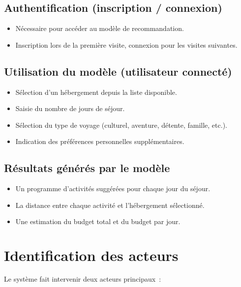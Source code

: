 \documentclass[12pt,a4paper]{report}
\begin{document}
\section{Authentification (inscription / connexion)}

\begin{itemize}
  \item Nécessaire pour accéder au modèle de recommandation.
  \item Inscription lors de la première visite, connexion pour les visites
        suivantes.
\end{itemize}

\section{Utilisation du modèle (utilisateur connecté)}

\begin{itemize}
  \item Sélection d'un hébergement depuis la liste disponible.
  \item Saisie du nombre de jours de séjour.
  \item Sélection du type de voyage (culturel, aventure, détente, famille, etc.).
  \item Indication des préférences personnelles supplémentaires.
\end{itemize}

\section{Résultats générés par le modèle}

\begin{itemize}
  \item Un programme d'activités suggérées pour chaque jour du séjour.
  \item La distance entre chaque activité et l'hébergement sélectionné.
  \item Une estimation du budget total et du budget par jour.
\end{itemize}

\chapter{Identification des acteurs}

Le système fait intervenir deux acteurs principaux~:
\end{document}

